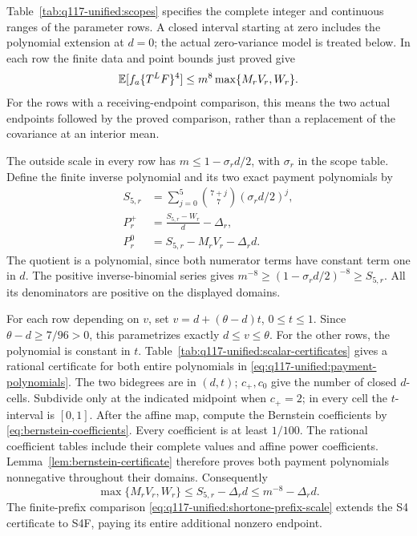 Table~\ref{tab:q117-unified:scopes} specifies the complete integer
and continuous ranges of the parameter rows. A closed interval
starting at zero includes the polynomial extension at \(d=0\);
the actual zero-variance model is treated below. In each row the
finite data and point bounds just proved give
\begin{equation}\label{eq:q117-unified:two-actual-endpoints}
 \mathbb E[f_a\{T^LF\}^4]
 \le m^8\max\{M_rV_r,W_r\}.
\end{equation}
For the rows with a receiving-endpoint comparison, this means
the two actual endpoints followed by the proved comparison,
rather than a replacement of the covariance at an interior mean.

The outside scale in every row has
\(m\le1-\sigma_rd/2\), with \(\sigma_r\) in the scope table.
Define the finite inverse polynomial and its two exact payment
polynomials by
\begin{equation}\label{eq:q117-unified:payment-polynomials}
\begin{aligned}
 S_{5,r}&=\sum_{j=0}^{5}\binom{7+j}{7}(\sigma_rd/2)^j,\\
 P_r^+&=\frac{S_{5,r}-W_r}{d}-\Delta_r,\\
 P_r^0&=S_{5,r}-M_rV_r-\Delta_rd.
\end{aligned}
\end{equation}
The quotient is a polynomial, since both numerator terms have
constant term one in \(d\). The positive inverse-binomial series
gives \(m^{-8}\ge(1-\sigma_rd/2)^{-8}\ge S_{5,r}\).
All its denominators are positive on the displayed domains.

For each row depending on \(v\), set
\(v=d+(\theta-d)t\), \(0\le t\le1\).
Since \(\theta-d\ge7/96>0\), this parametrizes exactly
\(d\le v\le\theta\). For the other rows, the polynomial is
constant in \(t\). Table~\ref{tab:q117-unified:scalar-certificates}
gives a rational certificate for both entire polynomials in
\eqref{eq:q117-unified:payment-polynomials}.
The two bidegrees are in \((d,t)\); \(c_+,c_0\) give the number
of closed \(d\)-cells. Subdivide only at the indicated midpoint
when \(c_+=2\); in every cell the \(t\)-interval is \([0,1]\).
After the affine map, compute the Bernstein coefficients by
\eqref{eq:bernstein-coefficients}. Every coefficient is at least
\(1/100\). The rational coefficient tables include
their complete values and affine power coefficients.
Lemma~\ref{lem:bernstein-certificate} therefore proves both
payment polynomials nonnegative throughout their domains.
Consequently
\begin{equation}\label{eq:q117-unified:paid-endpoints}
 \max\{M_rV_r,W_r\}\le S_{5,r}-\Delta_rd
       \le m^{-8}-\Delta_rd.
\end{equation}
The finite-prefix comparison
\eqref{eq:q117-unified:shortone-prefix-scale} extends the S4
certificate to S4F, paying its entire additional nonzero endpoint.

